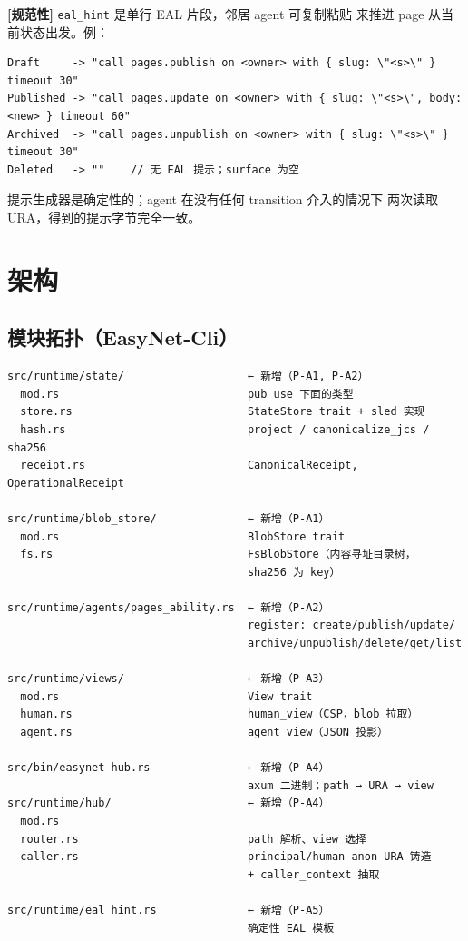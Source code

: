 \documentclass[11pt,a4paper]{article}
\newcommand{\normsv}{\textcolor{normativecolor}{\textbf{[规范性]}}\xspace}
\theoremstyle{definition}
\begin{document}
\normsv{} \texttt{eal\_hint} 是单行 EAL 片段，邻居 agent 可复制粘贴
来推进 page 从当前状态出发。例：

\begin{lstlisting}
Draft     -> "call pages.publish on <owner> with { slug: \"<s>\" } timeout 30"
Published -> "call pages.update on <owner> with { slug: \"<s>\", body: <new> } timeout 60"
Archived  -> "call pages.unpublish on <owner> with { slug: \"<s>\" } timeout 30"
Deleted   -> ""    // 无 EAL 提示；surface 为空
\end{lstlisting}

提示生成器是确定性的；agent 在没有任何 transition 介入的情况下
两次读取 URA，得到的提示字节完全一致。

\section{架构}
\label{sec:architecture}

\subsection{模块拓扑（EasyNet-Cli）}
\label{sec:module-map}

\begin{lstlisting}
src/runtime/state/                   ← 新增（P-A1, P-A2）
  mod.rs                             pub use 下面的类型
  store.rs                           StateStore trait + sled 实现
  hash.rs                            project / canonicalize_jcs / sha256
  receipt.rs                         CanonicalReceipt, OperationalReceipt

src/runtime/blob_store/              ← 新增（P-A1）
  mod.rs                             BlobStore trait
  fs.rs                              FsBlobStore（内容寻址目录树，
                                     sha256 为 key）

src/runtime/agents/pages_ability.rs  ← 新增（P-A2）
                                     register: create/publish/update/
                                     archive/unpublish/delete/get/list

src/runtime/views/                   ← 新增（P-A3）
  mod.rs                             View trait
  human.rs                           human_view（CSP，blob 拉取）
  agent.rs                           agent_view（JSON 投影）

src/bin/easynet-hub.rs               ← 新增（P-A4）
                                     axum 二进制；path → URA → view
src/runtime/hub/                     ← 新增（P-A4）
  mod.rs
  router.rs                          path 解析、view 选择
  caller.rs                          principal/human-anon URA 铸造
                                     + caller_context 抽取

src/runtime/eal_hint.rs              ← 新增（P-A5）
                                     确定性 EAL 模板
\end{lstlisting}
\end{document}
